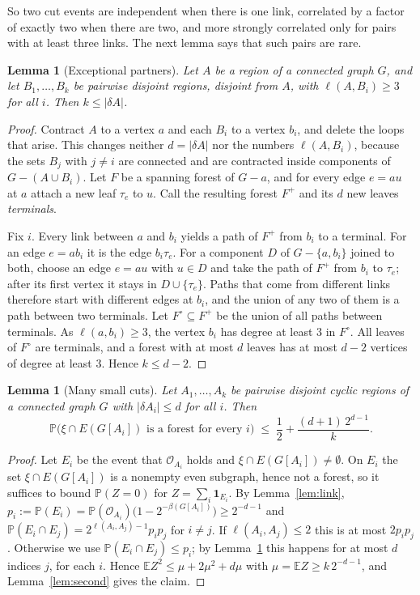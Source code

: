 \documentclass[11pt]{article}
\newtheorem{lemma}[theorem]{Lemma}
\theoremstyle{definition}
\theoremstyle{remark}
\newcommand{\PP}{\mathbb{P}}
\newcommand{\EE}{\mathbb{E}}
\newcommand{\cO}{\mathcal{O}}
\begin{document}
So two cut events are independent when there is one link, correlated by a factor of exactly two
when there are two, and more strongly correlated only for pairs with at least three links. The next
lemma says that such pairs are rare.

\begin{lemma}[Exceptional partners]\label{lem:exc}
Let $A$ be a region of a connected graph $G$, and let $B_1,\dots,B_k$ be pairwise disjoint regions,
disjoint from $A$, with $\ell(A,B_i)\ge3$ for all $i$. Then $k\le|\delta A|$.
\end{lemma}

\begin{proof}
Contract $A$ to a vertex $a$ and each $B_i$ to a vertex $b_i$, and delete the loops that arise.
This changes neither $d=|\delta A|$ nor the numbers $\ell(A,B_i)$, because the sets $B_j$ with
$j\ne i$ are connected and are contracted inside components of $G-(A\cup B_i)$. Let $F$ be a spanning forest of
$G-a$, and for every edge $e=au$ at $a$ attach a new leaf $\tau_e$ to $u$. Call the resulting forest
$F^{+}$ and its $d$ new leaves \emph{terminals}.

Fix $i$. Every link between $a$ and $b_i$ yields a path of $F^{+}$ from $b_i$ to a terminal. For an
edge $e=ab_i$ it is the edge $b_i\tau_e$. For a component $D$ of $G-\{a,b_i\}$ joined to both, choose
an edge $e=au$ with $u\in D$ and take the path of $F^{+}$ from $b_i$ to $\tau_e$; after its first
vertex it stays in $D\cup\{\tau_e\}$. Paths that come from different links therefore start with
different edges at $b_i$, and the union of any two of them is a path between two terminals. Let
$F^{\circ}\subseteq F^{+}$ be the union of all paths between terminals. As $\ell(a,b_i)\ge3$, the
vertex $b_i$ has degree at least $3$ in $F^{\circ}$. All leaves of $F^{\circ}$ are terminals, and a
forest with at most $d$ leaves has at most $d-2$ vertices of degree at least $3$. Hence $k\le d-2$.
\end{proof}

\begin{lemma}[Many small cuts]\label{lem:smallcuts}
Let $A_1,\dots,A_k$ be pairwise disjoint cyclic regions of a connected graph $G$ with
$|\delta A_i|\le d$ for all $i$. Then
\[
  \PP\bigl(\xi\cap E(G[A_i])\text{ is a forest for every }i\bigr)\;\le\;\frac12+\frac{(d+1)\,2^{d-1}}{k}.
\]
\end{lemma}

\begin{proof}
Let $E_i$ be the event that $\cO_{A_i}$ holds and $\xi\cap E(G[A_i])\ne\emptyset$. On $E_i$ the set
$\xi\cap E(G[A_i])$ is a nonempty even subgraph, hence not a forest, so it suffices to bound
$\PP(Z=0)$ for $Z=\sum_i\mathbf{1}_{E_i}$. By Lemma~\ref{lem:link},
$p_i:=\PP(E_i)=\PP(\cO_{A_i})\bigl(1-2^{-\beta(G[A_i])}\bigr)\ge2^{-d-1}$ and
$\PP(E_i\cap E_j)=2^{\ell(A_i,A_j)-1}p_ip_j$ for $i\ne j$. If $\ell(A_i,A_j)\le2$ this is at most
$2p_ip_j$. Otherwise we use $\PP(E_i\cap E_j)\le p_i$; by Lemma~\ref{lem:exc} this happens for at
most $d$ indices $j$, for each $i$. Hence $\EE Z^{2}\le\mu+2\mu^{2}+d\mu$ with
$\mu=\EE Z\ge k\,2^{-d-1}$, and Lemma~\ref{lem:second} gives the claim.
\end{proof}
\end{document}
